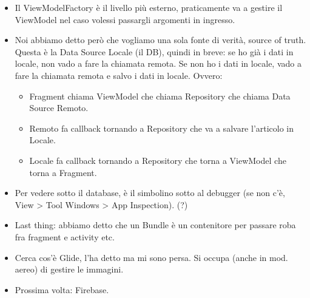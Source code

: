 \begin{itemize}
    \item Il ViewModelFactory è il livello più esterno, praticamente va a gestire il ViewModel nel caso volessi passargli argomenti in ingresso.
    \item Noi abbiamo detto però che vogliamo una sola fonte di verità, source of truth. Questa è la Data Source Locale (il DB), quindi in breve: se ho già i dati in locale, non vado a fare la chiamata remota. Se non ho i dati in locale, vado a fare la chiamata remota e salvo i dati in locale. Ovvero:
    \begin{itemize}
        \item Fragment chiama ViewModel che chiama Repository che chiama Data Source Remoto. 
        \item Remoto fa callback tornando a Repository che va a salvare l'articolo in Locale.
        \item Locale fa callback tornando a Repository che torna a ViewModel che torna a Fragment.
    \end{itemize}
    \item Per vedere sotto il database, è il simbolino sotto al debugger (se non c'è, View > Tool Windows > App Inspection). (?)
    \item Last thing: abbiamo detto che un Bundle è un contenitore per passare roba fra fragment e activity etc.
    \item Cerca cos'è Glide, l'ha detto ma mi sono persa. Si occupa (anche in mod. aereo) di gestire le immagini.
    \item Prossima volta: Firebase.
\end{itemize}
